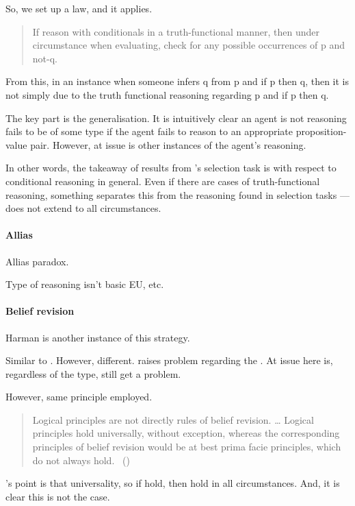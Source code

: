 \begin{note}
  So, we set up a law, and it applies.

  \begin{quote}
    If reason with conditionals in a truth-functional manner, then under circumstance when evaluating, check for any possible occurrences of p and not-q.
  \end{quote}

  From this, in an instance when someone infers q from p and if p then q, then it is not simply due to the truth functional reasoning regarding p and if p then q.

  The key part is the generalisation.
  It is intuitively clear an agent is not reasoning fails to be of some type if the agent fails to reason to an appropriate proposition-value pair.
  However, at issue is other instances of the agent's reasoning.

  In other words, the takeaway of results from \citeauthor{Wason:1966aa}'s selection task is with respect to conditional reasoning in general.
  Even if there are cases of truth-functional reasoning, something separates this from the reasoning found in selection tasks --- does not extend to all circumstances.
\end{note}

\paragraph{Allias}

\begin{note}
  Allias paradox.

  Type of reasoning isn't basic EU, etc.
\end{note}

\paragraph{Belief revision}

\begin{note}
  {
    \color{red}
    Harman is another instance of this strategy.
  }

  Similar to \citeauthor{Harman:1984aa,Harman:1986ux}.
  However, different.
  \citeauthor{Harman:1986ux} raises problem regarding the \tor{}.
  At issue here is, regardless of the type, still get a problem.

  However, same principle employed.

  \begin{quote}
    Logical principles are not directly rules of belief revision.
    \dots
    Logical principles hold universally, without exception, whereas the corresponding principles of belief revision would be at best prima facie principles, which do not always hold.%
    \mbox{ }\hfill\mbox{(\citeyear[107--108]{Harman:1984aa})}
  \end{quote}
  \citeauthor{Harman:1984aa}'s point is that universality, so if hold, then hold in all circumstances.
  And, it is clear this is not the case.
\end{note}

